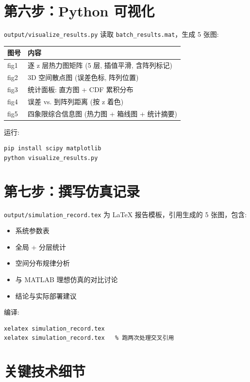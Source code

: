 \documentclass[12pt,a4paper]{ctexart}
\begin{document}
\section{第六步：Python 可视化}

\texttt{output/visualize\_results.py} 读取 \texttt{batch\_results.mat}，生成 5 张图:

\begin{longtable}{ll}
\toprule
\textbf{图号} & \textbf{内容} \\
\midrule
fig1 & 逐 z 层热力图矩阵 (5 层, 插值平滑, 含阵列标记) \\
fig2 & 3D 空间散点图 (误差色标, 阵列位置) \\
fig3 & 统计面板: 直方图 + CDF 累积分布 \\
fig4 & 误差 vs. 到阵列距离 (按 z 着色) \\
fig5 & 四象限综合信息图 (热力图 + 箱线图 + 统计摘要) \\
\bottomrule
\end{longtable}

运行:
\begin{lstlisting}[language=bash]
pip install scipy matplotlib
python visualize_results.py
\end{lstlisting}

\section{第七步：撰写仿真记录}

\texttt{output/simulation\_record.tex} 为 LaTeX 报告模板，引用生成的 5 张图，包含:

\begin{itemize}
    \item 系统参数表
    \item 全局 + 分层统计
    \item 空间分布规律分析
    \item 与 MATLAB 理想仿真的对比讨论
    \item 结论与实际部署建议
\end{itemize}

编译:
\begin{lstlisting}[language=bash]
xelatex simulation_record.tex
xelatex simulation_record.tex   % 跑两次处理交叉引用
\end{lstlisting}

\section{关键技术细节}
\end{document}
